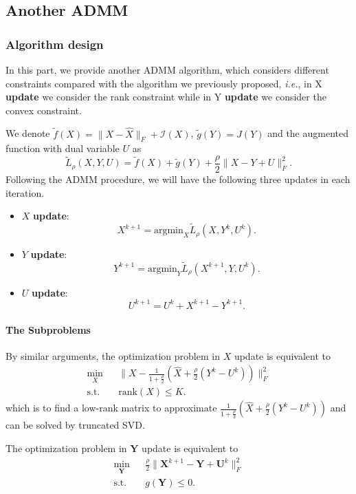 \subsection{Another ADMM}\label{sec:otherorder}
\subsubsection{Algorithm design}
In this part, we provide another ADMM algorithm, which considers different constraints compared with the algorithm we previously proposed, \textit{i.e.}, in X \textbf{update} we consider the rank constraint while in Y \textbf{update} we consider the convex constraint.

We denote $\tilde{f}(X) = \|X-\hat{X}\|_F+\mathcal{I}(X)$, $\tilde{g}(Y) = J(Y)$ and the augmented function with dual variable $U$ as
$$\tilde{L}_{\rho}(X,Y,U) = \tilde{f}(X)+\tilde{g}(Y)+\frac{\rho}{2}\|X-Y+U\|_F^2.$$
Following the ADMM procedure, we will have the following three updates in each iteration.
\begin{itemize}
\item $X$ \textbf{update}:
$$X^{k+1} = \text{argmin}_{X}\tilde{L}_{\rho}(X,Y^{k},U^{k}).$$
\item $Y$ \textbf{update}:
$$Y^{k+1} = \text{argmin}_{Y}\tilde{L}_{\rho}(X^{k+1},Y,U^{k}).$$
\item $U$ \textbf{update}:
$$U^{k+1} = U^k+X^{k+1}-Y^{k+1}.$$
\end{itemize}

\paragraph{The Subproblems}
By similar arguments, the optimization problem in $X$ update is equivalent to
\begin{subequations}
\begin{eqnarray*}\label{prob:ADMM}
\min_{X}&& \|X-\frac{1}{1+\frac{\rho}{2}}\left(\hat{X}+\frac{\rho}{2}(Y^k-U^k)\right)\|_F^2
\nonumber\\
\textrm{s.t.}
& & \text{rank}(X)\leq K.\nonumber
\end{eqnarray*}
\end{subequations}
which is to find a low-rank matrix to approximate $\frac{1}{1+\frac{\rho}{2}}\left(\hat{X}+\frac{\rho}{2}(Y^k-U^k)\right)$ and can be solved by truncated SVD.

The optimization problem in $\mathbf{Y}$ update is equivalent to
\begin{subequations}
\begin{eqnarray*}\label{prob:ADMM_Y}
 \min_{\mathbf{Y}}&& \frac{\rho}{2}\|\mathbf{X}^{k+1}-\mathbf{Y}+\mathbf{U}^k\|_F^2
\nonumber\\
\textrm{s.t.}
& & g(\mathbf{Y})\leq 0.\nonumber
\end{eqnarray*}
\end{subequations}

